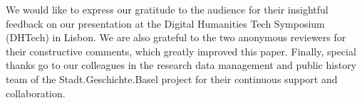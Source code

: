 \documentclass{anthology-ch}         %
\begin{document}
We would like to express our gratitude to the audience for their insightful feedback on our presentation at the Digital Humanities Tech Symposium (DHTech) in Lisbon. We are also grateful to the two anonymous reviewers for their constructive comments, which greatly improved this paper. Finally, special thanks go to our colleagues in the research data management and public history team of the Stadt.Geschichte.Basel project for their continuous support and collaboration.

\printbibliography



\end{document}
